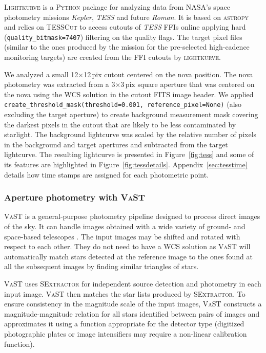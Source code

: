 \documentclass[twocolumn]{aastex631}
\begin{document}
\textsc{Lightkurve} \citep{2018ascl.soft12013L} is a \textsc{Python} package for analyzing data from
NASA's space photometry missions {\em Kepler}, {\em TESS} and future {\em Roman}.
It is based on \textsc{astropy} \citep{2022ApJ...935..167A} and relies on 
\textsc{TESSCut} \citep{2019ascl.soft05007B} to access cutouts of {\em TESS}
FFIs online applying hard (\texttt{quality\_bitmask=7407}) filtering on the quality flags.
The target pixel files (similar to the ones produced by the mission for the pre-selected
high-cadence monitoring targets) are created from the FFI cutouts by \textsc{lightkurve}.

We analyzed a small 12$\times$12\,pix cutout centered on the nova position. 
The nova photometry was extracted from a 3$\times$3\,pix square aperture 
that was centered on the nova using the WCS solution in the cutout FITS image header. 
We applied \texttt{create\_threshold\_mask(threshold=0.001, reference\_pixel=None)} 
(also excluding the target aperture) to create background measurement mask
covering the darkest pixels in the cutout that are likely to be less
contaminated by starlight. 
The background lightcurve was scaled by the relative number of pixels in the
background and target apertures and subtracted from the target lightcurve.
The resulting lightcurve is presented in Figure~\ref{fig:tess} and some of
its features are highlighted in Figure~\ref{fig:tessdetails}.
Appendix~\ref{sec:tesstime} details how time stamps are assigned for each
photometric point.


\subsubsection{Aperture photometry with \textsc{VaST}}
\label{sec:obstessvast}

\textsc{VaST} is a general-purpose photometry pipeline designed to process direct images of the sky. 
It can handle images obtained with a wide variety of ground- and space-based telescopes \citep{2018A&C....22...28S}. 
The input images may be shifted and rotated with respect to each other. They do not need to have a WCS solution 
as \textsc{VaST} will automatically match stars detected at the reference image to the ones found at 
all the subsequent images by finding similar triangles of stars.

\textsc{VaST} uses \textsc{SExtractor} \citep{1996A&AS..117..393B} for independent source detection 
and photometry in each input image. \textsc{VaST} then matches the star lists produced by \textsc{SExtractor}. 
To ensure consistency in the magnitude scale of the input images, 
\textsc{VaST} constructs a magnitude-magnitude relation for all stars identified between pairs of images 
and approximates it using a function appropriate for the detector type 
(digitized photographic plates or image intensifiers may require a
non-linear calibration function). 
\end{document}
